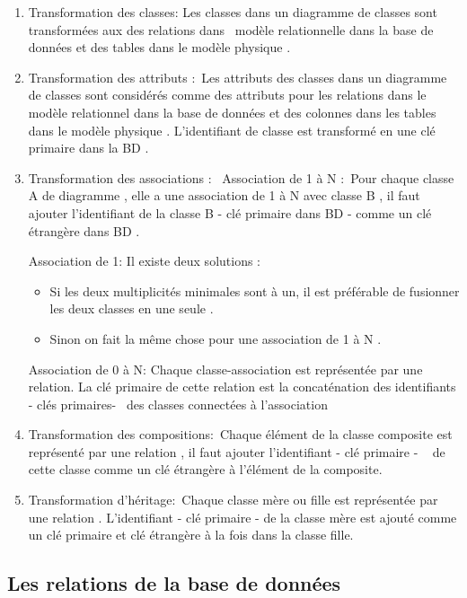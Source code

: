 \begin{enumerate}
	\item Transformation des classes: Les classes dans un diagramme de classes sont transformées aux des relations dans  modèle relationnelle dans la base de données et des tables dans le modèle physique .
	
	\item Transformation des attributs : Les attributs des classes dans un diagramme de classes sont considérés comme des attributs pour les relations dans le modèle relationnel dans la base de données et des colonnes dans les tables dans le modèle physique .
	L’identifiant de classe est transformé en une clé primaire dans la BD .
	
	\item Transformation des associations : 
		\subitem Association de 1 à N : Pour chaque classe A de diagramme , elle a une association de 1 à N avec classe B , il faut ajouter l’identifiant de la classe B - clé primaire dans BD - comme un clé étrangère dans BD .
		
		\subitem Association de 1: Il existe deux solutions :
		\begin{itemize}
			\item Si les deux multiplicités minimales sont à un, il est préférable de fusionner les deux classes en une seule .
			\item Sinon on fait la même chose pour une association de 1 à N .
		\end{itemize}
	
		\subitem Association de 0 à N: Chaque classe-association est représentée par une relation. La clé primaire de cette relation est la concaténation des identifiants - clés primaires-  des classes connectées à l'association
		
	\item Transformation des compositions: Chaque élément de la classe composite est représenté par une relation , il faut ajouter l’identifiant - clé primaire -   de cette classe comme un clé étrangère à l'élément de la composite.
	
	\item Transformation d'héritage: Chaque classe mère ou fille est représentée par une relation . L’identifiant - clé primaire - de la classe mère est ajouté comme un clé primaire et clé étrangère à la fois dans la classe fille.
	
\end{enumerate}

\subsection{Les relations de la base de données}

